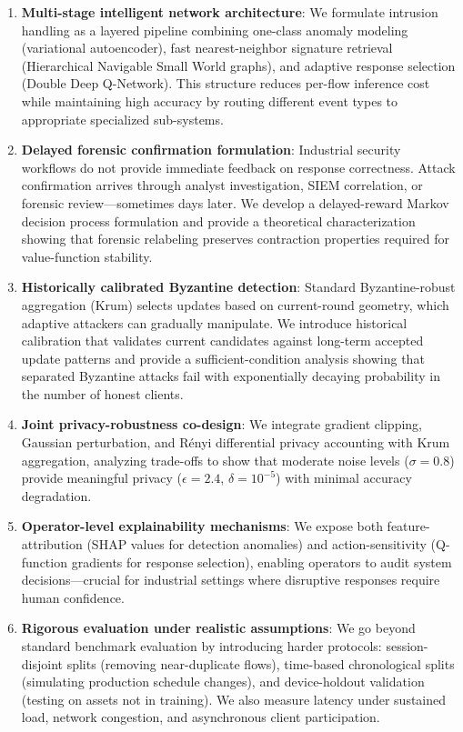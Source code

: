 \documentclass[preprint,12pt]{elsarticle}
\begin{document}
\begin{enumerate}[leftmargin=1.3em]
    \item \textbf{Multi-stage intelligent network architecture}: We formulate intrusion handling as a layered pipeline combining one-class anomaly modeling (variational autoencoder), fast nearest-neighbor signature retrieval (Hierarchical Navigable Small World graphs), and adaptive response selection (Double Deep Q-Network). This structure reduces per-flow inference cost while maintaining high accuracy by routing different event types to appropriate specialized sub-systems.
    
    \item \textbf{Delayed forensic confirmation formulation}: Industrial security workflows do not provide immediate feedback on response correctness. Attack confirmation arrives through analyst investigation, SIEM correlation, or forensic review---sometimes days later. We develop a delayed-reward Markov decision process formulation and provide a theoretical characterization showing that forensic relabeling preserves contraction properties required for value-function stability.
    
    \item \textbf{Historically calibrated Byzantine detection}: Standard Byzantine-robust aggregation (Krum) selects updates based on current-round geometry, which adaptive attackers can gradually manipulate. We introduce historical calibration that validates current candidates against long-term accepted update patterns and provide a sufficient-condition analysis showing that separated Byzantine attacks fail with exponentially decaying probability in the number of honest clients.
    
    \item \textbf{Joint privacy-robustness co-design}: We integrate gradient clipping, Gaussian perturbation, and Rényi differential privacy accounting with Krum aggregation, analyzing trade-offs to show that moderate noise levels ($\sigma = 0.8$) provide meaningful privacy ($\epsilon = 2.4$, $\delta = 10^{-5}$) with minimal accuracy degradation.
    
    \item \textbf{Operator-level explainability mechanisms}: We expose both feature-attribution (SHAP values for detection anomalies) and action-sensitivity (Q-function gradients for response selection), enabling operators to audit system decisions---crucial for industrial settings where disruptive responses require human confidence.
    
    \item \textbf{Rigorous evaluation under realistic assumptions}: We go beyond standard benchmark evaluation by introducing harder protocols: session-disjoint splits (removing near-duplicate flows), time-based chronological splits (simulating production schedule changes), and device-holdout validation (testing on assets not in training). We also measure latency under sustained load, network congestion, and asynchronous client participation.
\end{enumerate}
\end{document}
